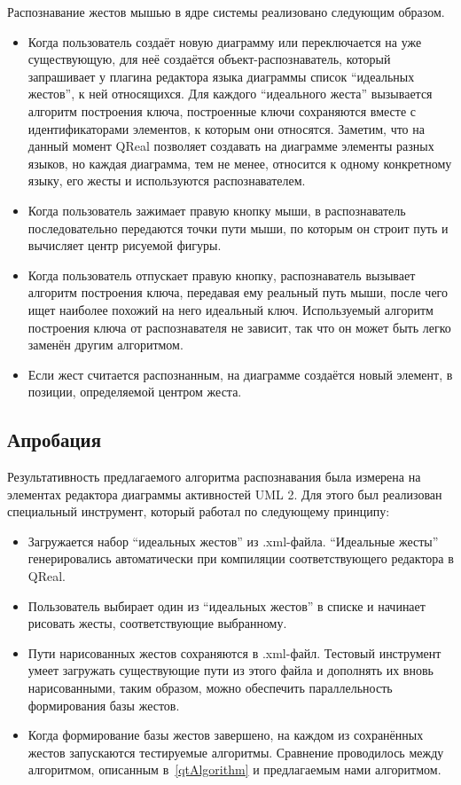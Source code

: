 \documentclass[a5paper]{article}
\begin{document}
Распознавание жестов мышью в ядре системы реализовано следующим образом.
\begin{itemize}
  \item Когда пользователь создаёт новую диаграмму или переключается на уже существующую, для неё создаётся объект-распознаватель, который запрашивает у плагина редактора языка диаграммы список ``идеальных жестов'', к ней относящихся. Для каждого ``идеального жеста'' вызывается алгоритм построения ключа, построенные ключи сохраняются вместе с идентификаторами элементов, к которым они относятся. Заметим, что на данный момент QReal позволяет создавать на диаграмме элементы разных языков, но каждая диаграмма, тем не менее, относится к одному конкретному языку, его жесты и используются распознавателем.
  \item Когда пользователь зажимает правую кнопку мыши, в распознаватель последовательно передаются точки пути мыши, по которым он строит путь и вычисляет центр рисуемой фигуры.
  \item Когда пользователь отпускает правую кнопку, распознаватель вызывает алгоритм построения ключа, передавая ему реальный путь мыши, после чего ищет наиболее похожий на него идеальный ключ. Используемый алгоритм построения ключа от распознавателя не зависит, так что он может быть легко заменён другим алгоритмом.
  \item Если жест считается распознанным, на диаграмме создаётся новый элемент, в позиции, определяемой центром жеста.
\end{itemize}

\subsection{Апробация}

Результативность предлагаемого алгоритма распознавания была измерена на элементах редактора диаграммы активностей UML 2. Для этого был реализован специальный инструмент, который работал по следующему принципу:
\begin{itemize}
  \item Загружается набор ``идеальных жестов'' из .xml-файла. ``Идеальные жесты'' генерировались автоматически при компиляции соответствующего редактора в QReal.
  \item Пользователь выбирает один из ``идеальных жестов'' в списке и начинает рисовать жесты, соответствующие выбранному.
  \item Пути нарисованных жестов сохраняются в .xml-файл. Тестовый инструмент умеет загружать существующие пути из этого файла и дополнять их вновь нарисованными, таким образом, можно обеспечить параллельность формирования базы жестов.
  \item Когда формирование базы жестов завершено, на каждом из сохранённых жестов запускаются тестируемые алгоритмы. Сравнение проводилось между алгоритмом, описанным в~\ref{qtAlgorithm} и предлагаемым нами алгоритмом.
\end{itemize}
\end{document}
